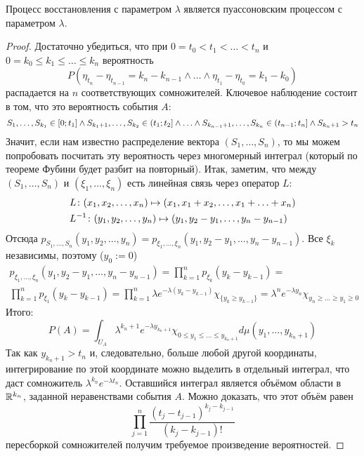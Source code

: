 \begin{theorem}
	Процесс восстановления с параметром $\lambda$ является пуассоновским процессом с параметром $\lambda$.
\end{theorem}

\begin{proof}
	Достаточно убедиться, что при $0 = t_0 < t_1 < \ldots < t_n$ и $0 = k_0 \le k_1 \le \ldots \le k_n$ вероятность
	\[
		P(\eta_{t_n} - \eta_{t_{n - 1}} = k_n - k_{n - 1} \wedge \ldots \wedge \eta_{t_1} - \eta_{t_0} = k_1 - k_0)
	\]
	распадается на $n$ соответствующих сомножителей. Ключевое наблюдение состоит в том, что это вероятность события $A$:
	\[
		S_1, \ldots, S_{k_1} \in [0; t_1] \wedge S_{k_1 + 1}, \ldots, S_{k_2} \in \left(t_1; t_2\right] \wedge \ldots \wedge S_{k_{n - 1} + 1}, \ldots, S_{k_n} \in \left(t_{n - 1}; t_n\right] \wedge S_{k_n + 1} > t_n
	\]
	Значит, если нам известно распределение вектора $(S_1, \ldots, S_n)$, то мы можем попробовать посчитать эту вероятность через многомерный интеграл (который по теореме Фубини будет разбит на повторный). Итак, заметим, что между $(S_1, \ldots, S_n)$ и $(\xi_1, \ldots, \xi_n)$ есть линейная связь через оператор $L$:
	\begin{align*}
		&{L \colon (x_1, x_2, \ldots, x_n) \mapsto (x_1, x_1 + x_2, \ldots, x_1 + \ldots + x_n)}
		\\
		&{L^{-1} \colon (y_1, y_2, \ldots, y_n) \mapsto (y_1, y_2 - y_1, \ldots, y_n - y_{n - 1})}
	\end{align*}
	Отсюда $p_{S_1, \ldots, S_n}(y_1, y_2, \ldots, y_n) = p_{\xi_1, \ldots, \xi_n}(y_1, y_2 - y_1, \ldots, y_n - y_{n - 1})$. Все $\xi_k$ независимы, поэтому ($y_0 := 0$)
	\begin{multline*}
		p_{\xi_1, \ldots, \xi_n}(y_1, y_2 - y_1, \ldots, y_n - y_{n - 1}) = \prod_{k = 1}^n p_{\xi_k}(y_k - y_{k - 1}) =
		\\
		\prod_{k = 1}^n p_{\xi_1}(y_k - y_{k - 1}) = \prod_{k = 1}^n \lambda e^{-\lambda(y_k - y_{k - 1})}\chi_{\{y_k \ge y_{k - 1}\}} = \lambda^ne^{-\lambda y_n}\chi_{y_n \ge \ldots \ge y_1 \ge 0}
	\end{multline*}
	Итого:
	\[
		P(A) = \int_{U_A} \lambda^{k_n + 1}e^{-\lambda y_{k_n + 1}}\chi_{0 \le y_1 \le \ldots \le y_{k_n + 1}}d\mu(y_1, \ldots, y_{k_n + 1})
	\]
	Так как $y_{k_n + 1} > t_n$ и, следовательно, больше любой другой координаты, интегрирование по этой координате можно выделить в отдельный интеграл, что даст сомножитель $\lambda^{k_n} e^{-\lambda t_n}$. Оставшийся интеграл является объёмом области в $\mathbb{R}^{k_n}$, заданной неравенствами события $A$. Можно доказать, что этот объём равен
	\[
		\prod_{j = 1}^n \frac{(t_j - t_{j - 1})^{k_j - k_{j - 1}}}{(k_j - k_{j - 1})!}
	\]
	пересборкой сомножителей получим требуемое произведение вероятностей.
\end{proof}

